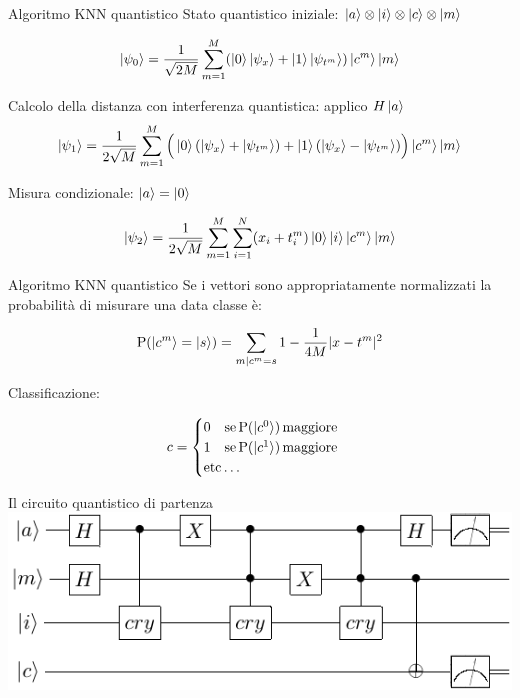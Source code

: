 \documentclass{beamer}
\begin{document}
    \begin{frame}{Algoritmo KNN quantistico}
        Stato quantistico iniziale: $\ket{a} \otimes \ket{i} \otimes \ket{c} \otimes \ket{m}$

		\begin{equation*}
			\ket{\psi_0} = \frac{1}{\sqrt{2M}} \sum_{m=1}^M 
			(\ket{0}\ket{\psi_x}+\ket{1}\ket{\psi_{t^m}})\ket{c^m}\ket{m}
		\end{equation*}

		Calcolo della distanza con interferenza quantistica: applico $H\ket{a}$
		\begin{equation*}
			\ket{\psi_1} = \frac{1}{2\sqrt{M}}\sum_{m=1}^M 
			\Big( \ket{0}(\ket{\psi_x}+\ket{\psi_{t^m}}) + \ket{1}(\ket{\psi_x}-\ket{\psi_{t^m}}) \Big) \ket{c^m}\ket{m}
		\end{equation*}
	
		Misura condizionale: $\ket{a} = \ket{0}$

		\begin{equation*}
			\ket{\psi_2} = \frac{1}{2\sqrt{M}} \sum_{m=1}^M \sum_{i=1}^N
			(x_i+t_i^m)\ket{0}\ket{i}\ket{c^m}\ket{m}
		\end{equation*}
    \end{frame}

    \begin{frame}{Algoritmo KNN quantistico}
        Se i vettori sono appropriatamente normalizzati 
        la probabilità di misurare una data classe è:

		\begin{equation*}
			\text{P}(\ket{c^m} = \ket{s}) = \sum_{m|c^m=s} 
			1 - \frac{1}{4M} |x-t^m|^2
		\end{equation*}

		Classificazione:

		\begin{equation*}
			c = \begin{cases}
			0 \quad \text{se}\, \text{P}(\ket{c^0})\, \text{maggiore} \\
			1 \quad \text{se}\, \text{P}(\ket{c^1})\, \text{maggiore} \\
			\text{etc}\ldots
		\end{cases}
		\end{equation*}
    \end{frame}

    \begin{frame}{Il circuito quantistico di partenza}
        \includegraphics[width=\textwidth]{gfx/qknn.pdf}
    \end{frame}
\end{document}
